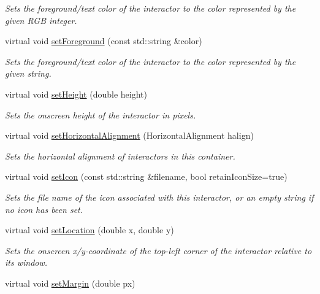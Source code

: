 \begin{DoxyCompactItemize}
\begin{DoxyCompactList}\small\item\em Sets the foreground/text color of the interactor to the color represented by the given R\+GB integer. \end{DoxyCompactList}\item 
virtual void \mbox{\hyperlink{classGInteractor_af59209aeadea6dfc6d97a2d8531f50e1}{set\+Foreground}} (const std\+::string \&color)
\begin{DoxyCompactList}\small\item\em Sets the foreground/text color of the interactor to the color represented by the given string. \end{DoxyCompactList}\item 
virtual void \mbox{\hyperlink{classGInteractor_a9e280bfc4544dfaf8e4376c4e1a74357}{set\+Height}} (double height)
\begin{DoxyCompactList}\small\item\em Sets the onscreen height of the interactor in pixels. \end{DoxyCompactList}\item 
virtual void \mbox{\hyperlink{classGContainer_a901653aacb9991ee9a8b70d4a932f0c9}{set\+Horizontal\+Alignment}} (Horizontal\+Alignment halign)
\begin{DoxyCompactList}\small\item\em Sets the horizontal alignment of interactors in this container. \end{DoxyCompactList}\item 
virtual void \mbox{\hyperlink{classGInteractor_a762e139aa311461c3984d3ad28293f64}{set\+Icon}} (const std\+::string \&filename, bool retain\+Icon\+Size=true)
\begin{DoxyCompactList}\small\item\em Sets the file name of the icon associated with this interactor, or an empty string if no icon has been set. \end{DoxyCompactList}\item 
virtual void \mbox{\hyperlink{classGInteractor_a04594e8ba9b98513a64f1da00dcae18c}{set\+Location}} (double x, double y)
\begin{DoxyCompactList}\small\item\em Sets the onscreen x/y-\/coordinate of the top-\/left corner of the interactor relative to its window. \end{DoxyCompactList}\item 
virtual void \mbox{\hyperlink{classGContainer_a79b7a5ffc0a63c8f11be4ed59808f60d}{set\+Margin}} (double px)

\end{DoxyCompactItemize}
